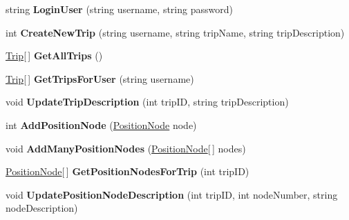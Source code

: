 \begin{DoxyCompactItemize}
\item 
\hypertarget{class_trip_service_client_a3afa56d820fedf2be986fa73c9eb0f8a}{
string {\bfseries LoginUser} (string username, string password)}
\label{class_trip_service_client_a3afa56d820fedf2be986fa73c9eb0f8a}

\item 
\hypertarget{class_trip_service_client_adabcca2baead495a63e7759d3ab9f12d}{
int {\bfseries CreateNewTrip} (string username, string tripName, string tripDescription)}
\label{class_trip_service_client_adabcca2baead495a63e7759d3ab9f12d}

\item 
\hypertarget{class_trip_service_client_ad0f3f0ca90e152969c21c29bc0bab90e}{
\hyperlink{class_trip}{Trip}\mbox{[}$\,$\mbox{]} {\bfseries GetAllTrips} ()}
\label{class_trip_service_client_ad0f3f0ca90e152969c21c29bc0bab90e}

\item 
\hypertarget{class_trip_service_client_a747b67426ba816f5dac7a1a1416a5e38}{
\hyperlink{class_trip}{Trip}\mbox{[}$\,$\mbox{]} {\bfseries GetTripsForUser} (string username)}
\label{class_trip_service_client_a747b67426ba816f5dac7a1a1416a5e38}

\item 
\hypertarget{class_trip_service_client_a5c349058df8edf45d7f20de96fbf01b7}{
void {\bfseries UpdateTripDescription} (int tripID, string tripDescription)}
\label{class_trip_service_client_a5c349058df8edf45d7f20de96fbf01b7}

\item 
\hypertarget{class_trip_service_client_a9c71c96ccffe17725458e67e0a8eb146}{
int {\bfseries AddPositionNode} (\hyperlink{class_position_node}{PositionNode} node)}
\label{class_trip_service_client_a9c71c96ccffe17725458e67e0a8eb146}

\item 
\hypertarget{class_trip_service_client_ab447a0352c8c2fd66eaa33e7f363ee1c}{
void {\bfseries AddManyPositionNodes} (\hyperlink{class_position_node}{PositionNode}\mbox{[}$\,$\mbox{]} nodes)}
\label{class_trip_service_client_ab447a0352c8c2fd66eaa33e7f363ee1c}

\item 
\hypertarget{class_trip_service_client_ad9979633d5094e6fac28fbbd89914ee8}{
\hyperlink{class_position_node}{PositionNode}\mbox{[}$\,$\mbox{]} {\bfseries GetPositionNodesForTrip} (int tripID)}
\label{class_trip_service_client_ad9979633d5094e6fac28fbbd89914ee8}

\item 
\hypertarget{class_trip_service_client_aef551495acee0ff6456fcd99df1e1a7e}{
void {\bfseries UpdatePositionNodeDescription} (int tripID, int nodeNumber, string nodeDescription)}
\label{class_trip_service_client_aef551495acee0ff6456fcd99df1e1a7e}


\end{DoxyCompactItemize}
